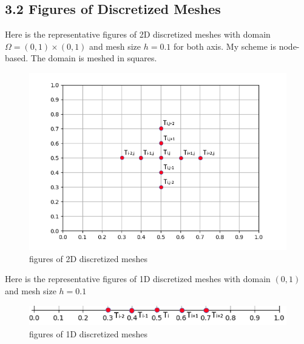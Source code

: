 \documentclass{article}
\begin{document}
\subsection*{3.2 Figures of Discretized Meshes}
Here is the representative figures of 2D discretized meshes with domain $\Omega = (0, 1)\times(0, 1)$ and mesh size $h = 0.1$ for both axis. My scheme is node-based. The domain is meshed in squares.
\begin{figure}[h]
  \includegraphics[width=\linewidth]{figure_2}
  \caption{figures of 2D discretized meshes}
\end{figure}

Here is the representative figures of 1D discretized meshes with domain $(0, 1)$ and mesh size $h = 0.1$

\newpage

\begin{figure}[h]
  \includegraphics[width=\linewidth]{figure_1}
  \caption{figures of 1D discretized meshes}
\end{figure}
\end{document}
